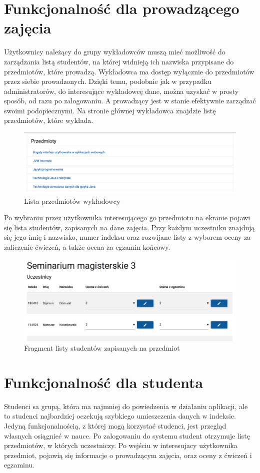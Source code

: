 \documentclass{xmgr}
\begin{document}
\section{Funkcjonalność dla prowadzącego zajęcia}

\indent \indent \indent Użytkownicy należący do grupy wykładowców muszą mieć możliwość do zarządzania listą studentów, na której widnieją ich nazwiska przypisane do przedmiotów, które prowadzą. Wykładowca ma dostęp wyłącznie do przedmiotów przez siebie prowadzonych. Dzięki temu, podobnie jak w przypadku administratorów, do interesujące wykładowcę dane, można uzyskać w prosty sposób, od razu po zalogowaniu. A prowadzący jest w stanie efektywnie zarządzać swoimi podopiecznymi. Na stronie głównej wykładowca znajdzie listę przedmiotów, które wykłada.

\begin{figure}[th!]
\centering
\includegraphics[width=0.7\hsize]{images/subjectList}
\caption{Lista przedmiotów wykładowcy\label{RYS.10}}
\end{figure}

\noindent Po wybraniu przez użytkownika interesującego go przedmiotu na ekranie pojawi się lista studentów,  zapisanych na dane zajęcia. Przy każdym uczestniku znajdują się jego imię i nazwisko, numer indeksu oraz rozwijane listy z wyborem oceny za zaliczenie ćwiczeń, a także ocena za egzamin końcowy.

\begin{figure}[th!]
\centering
\includegraphics[width=0.7\hsize]{images/studentList}
\caption{Fragment listy studentów zapisanych na przedmiot\label{RYS.11}}
\end{figure}

\section{Funkcjonalność dla studenta}
\indent \indent \indent Studenci sa grupą, która ma najmniej do powiedzenia w działaniu aplikacji, ale to studenci najbardziej oczekują szybkiego umieszczenia danych w indeksie. Jedyną funkcjonalnością, z której mogą korzystać studenci, jest przegląd własnych osiągnieć w nauce. Po zalogowaniu do systemu student otrzymuje listę przedmiotów, w których uczestniczy. Po wejściu w interesujacy użytkownika przedmiot, pojawią się informacje o prowadzącym zajęcia, oraz oceny z ćwiczeń i egzaminu.
\end{document}
